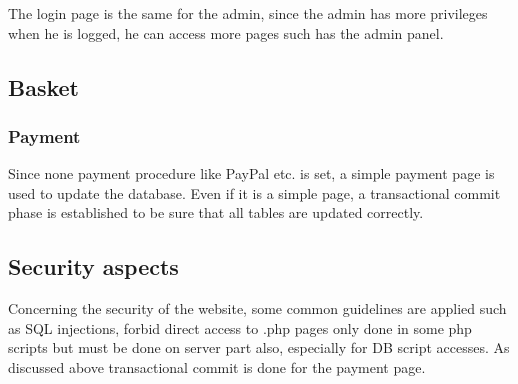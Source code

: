 \documentclass{article}
\begin{document}
The login page is the same for the admin, since the admin has more privileges when he is logged, he can access more pages such has the admin panel.

\subsection{Basket}

\subsubsection{Payment}
Since none payment procedure like PayPal etc. is set, a simple payment page is used to update the database. Even if it is a simple page, a transactional commit phase is established to be sure that all tables are updated correctly.

\subsection{Security aspects}
Concerning the security of the website, some common guidelines are applied such as SQL injections, forbid direct access to .php pages only done in some php scripts but must be done on server part also, especially for DB script accesses. As discussed above transactional commit is done for the payment page.
\end{document}

